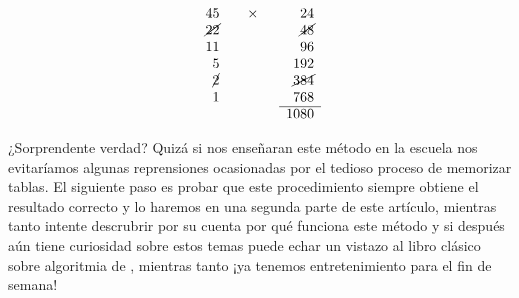 \documentclass[12pt]{article}
\theoremstyle{definition}
\begin{document}

\[
\begin{array}{rcccr}
45 &  & \times &  & 24 \\
\cancel{22} &  &        &  & \cancel{48}\\
11 &  &        &  & 96 \\
 5 &  &        &  & 192 \\
 \cancel{2} &  &        &  & \cancel{384} \\
 1 &  &        &  & 768 \\ \cline{5-5}
   &  &        &  & 1080 \\
\end{array}
\]

¿Sorprendente verdad? Quiz\'a si nos ense\~naran este m\'etodo en la escuela nos evitar\'iamos algunas reprensiones ocasionadas por el tedioso proceso de memorizar tablas. El siguiente paso es probar que este procedimiento siempre obtiene el resultado correcto y lo haremos en una segunda parte de este art\'iculo, mientras tanto intente descrubrir por su cuenta por qu\'e funciona este m\'etodo y si despu\'es a\'un tiene curiosidad sobre estos temas puede echar un vistazo al libro cl\'asico sobre algoritmia de \citet{Brassard}, mientras tanto ¡ya tenemos entretenimiento para el fin de semana!



\end{document}
